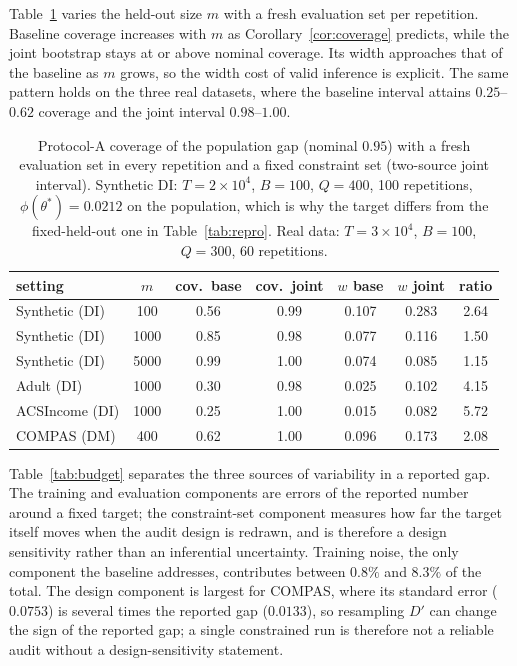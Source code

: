\documentclass[pdflatex,sn-basic]{sn-jnl}
\newcommand{\Dp}{D'}
\begin{document}

Table~\ref{tab:protocolA} varies the held-out size $m$ with a fresh evaluation set per repetition.
Baseline coverage increases with $m$ as Corollary~\ref{cor:coverage} predicts, while the joint
bootstrap stays at or above nominal coverage.  Its width approaches that of the baseline as $m$ grows,
so the width cost of valid inference is explicit.  The same pattern holds on the three real
datasets, where the baseline interval attains $0.25$--$0.62$ coverage and the joint interval
$0.98$--$1.00$.

\begin{table}[t]
\centering
\small
\setlength{\tabcolsep}{4pt}
\caption{Protocol-A coverage of the population gap (nominal $0.95$) with a fresh evaluation set in
every repetition and a fixed constraint set (two-source joint interval).  Synthetic DI: $T=2\times10^4$, $B=100$, $Q=400$, 100 repetitions, $\phi(\theta^*)=0.0212$ on the population, which is why the target differs from the fixed-held-out one in Table~\ref{tab:repro}.  Real data: $T=3\times10^4$, $B=100$, $Q=300$, 60 repetitions.}
\label{tab:protocolA}
\begin{tabular}{lcccccc}
\toprule
setting & $m$ & cov.\ base & cov.\ joint & $w$ base & $w$ joint & ratio \\
\midrule
Synthetic (DI) & 100  & 0.56 & 0.99 & 0.107 & 0.283 & 2.64 \\
Synthetic (DI) & 1000 & 0.85 & 0.98 & 0.077 & 0.116 & 1.50 \\
Synthetic (DI) & 5000 & 0.99 & 1.00 & 0.074 & 0.085 & 1.15 \\
Adult (DI)     & 1000 & 0.30 & 0.98 & 0.025 & 0.102 & 4.15 \\
ACSIncome (DI) & 1000 & 0.25 & 1.00 & 0.015 & 0.082 & 5.72 \\
COMPAS (DM)    & 400  & 0.62 & 1.00 & 0.096 & 0.173 & 2.08 \\
\bottomrule
\end{tabular}
\end{table}


Table~\ref{tab:budget} separates the three sources of variability in a reported gap.  The training
and evaluation components are errors of the reported number around a fixed target; the
constraint-set component measures how far the target itself moves when the audit design is redrawn,
and is therefore a design sensitivity rather than an inferential uncertainty.  Training noise, the only component the baseline addresses, contributes between $0.8\%$ and $8.3\%$ of
the total.  The design component is largest for COMPAS, where its standard error ($0.0753$) is several times the reported gap ($0.0133$), so resampling $\Dp$ can change the sign of the reported gap; a single constrained run is therefore not a reliable audit without a design-sensitivity statement.
\end{document}
